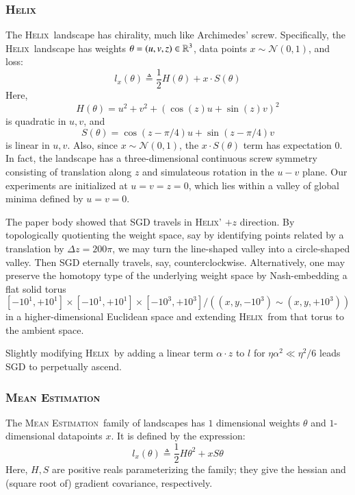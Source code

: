 \documentclass[anon,12pt]{colt2021} %
\newcommand{\Nn}{\mathcal{N}}   \newcommand{\NN}{\mathbb{N}}
\newcommand{\Helix}{\textsc{Helix}}
\newcommand{\MeanEstimation}{\textsc{Mean Estimation}}
\begin{document}
{        \subsubsection{\Helix}
            The \Helix\ landscape has chirality, much like Archimedes'
            screw.
            Specifically, the \Helix\ landscape has
            weights     $\theta = (u,v,z) \in \mathbb{R}^3$,
            data points $x \sim \Nn(0, 1)$,
            and loss:
            $$
                l_x(\theta)
                \triangleq
                \frac{1}{2} H(\theta) + x \cdot S(\theta)
            $$
            Here,
            $$
                H(\theta) = u^2 + v^2 + (\cos(z) u + \sin(z) v)^2
            $$
            is quadratic in $u, v$, and
            $$
                S(\theta) = \cos(z-\pi/4) u + \sin(z-\pi/4) v
            $$
            is linear in $u, v$.
            Also, since $x \sim \Nn(0,1)$, the $x \cdot S(\theta)$ term has
            expectation $0$.
            In fact, the landscape has a three-dimensional continuous screw
            symmetry consisting of translation along $z$ and simulateous
            rotation in the $u-v$ plane.  Our experiments are initialized at
            $u=v=z=0$, which lies within a valley of global minima defined by
            $u=v=0$.  

            The paper body showed that SGD travels in \Helix' $+z$
            direction.  By topologically quotienting the weight space, say by
            identifying points related by a translation by $\Delta z = 200\pi$,
            we may turn the line-shaped valley into a circle-shaped valley.
            Then SGD eternally travels, say, counterclockwise.  Alternatively,
            one may preserve the homotopy type of the underlying weight space
            by Nash-embedding a flat solid torus
            $$
                [-10^1,+10^1]\times[-10^1,+10^1]\times[-10^3,+10^3]/((x,y,-10^3)\sim(x,y,+10^3))
            $$
            in a higher-dimensional Euclidean space and extending \Helix\ from
            that torus to the ambient space.

            Slightly modifying \Helix\ by adding a linear term $\alpha\cdot z$
            to $l$ for $\eta\alpha^2 \ll \eta^2/6$ leads SGD to perpetually ascend.
           
        \subsubsection{\MeanEstimation}
            The \MeanEstimation\, family of landscapes has $1$ dimensional
            weights $\theta$ and $1$-dimensional datapoints $x$.  It is defined
            by the expression:
            $$
                l_x(\theta)
                \triangleq
                \frac{1}{2} H \theta^2 + x S \theta
            $$
            Here, $H, S$ are positive reals parameterizing the family; they
            give the hessian and (square root of) gradient covariance,
            respectively.

}
\end{document}
